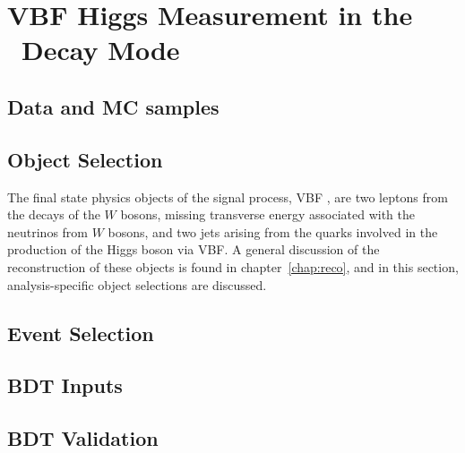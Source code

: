 \chapter{VBF Higgs Measurement in the \wwlnln~Decay Mode}
\label{chap:analysis}




\section{Data and MC samples}
\label{chap:analysis:sec:data_mc}


\section{Object Selection}
\label{chap:analysis:sec:objects}

The final state physics objects of the signal process, VBF \hwwlnln, are
two leptons from the decays of the $W$ bosons, missing transverse
energy associated with the neutrinos from $W$ bosons, and two
jets arising from the quarks involved in the production of the Higgs
boson via VBF. A general discussion of the reconstruction of these
objects is found in chapter~\ref{chap:reco}, and in this section,
analysis-specific object selections are discussed. 



\section{Event Selection}
\label{chap:analysis:sec:event_selection}


\section{BDT Inputs}
\label{chap:analysis:sec:bdt_inputs}


\section{BDT Validation}
\label{chap:analysis:sec:bdt_validation}


